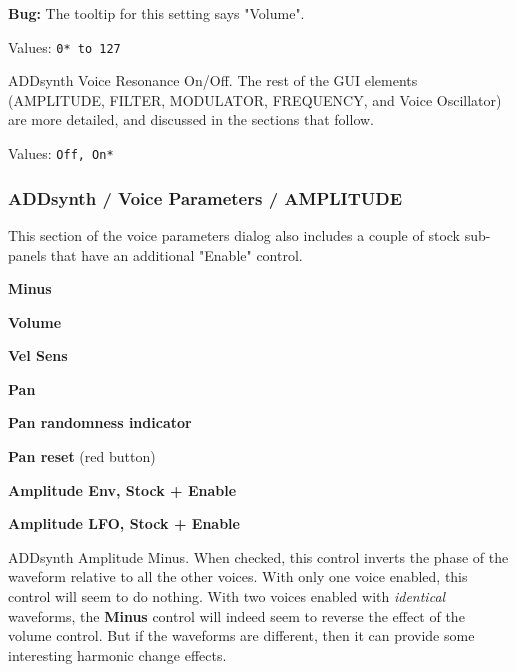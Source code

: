    \textbf{Bug:}
   The tooltip for this setting says "Volume".

   Values: \texttt{0* to 127}

   ADDsynth Voice Resonance On/Off.
   The rest of the GUI elements
   (AMPLITUDE, FILTER, MODULATOR, FREQUENCY, and Voice Oscillator)
   are more detailed, and discussed in the sections that follow.

   Values: \texttt{Off, On*}

\subsubsection{ADDsynth / Voice Parameters / AMPLITUDE}
\label{subsubsec:addsynth_voice_parameters_amplitude}

   This section of the voice parameters dialog also includes a couple of
   stock sub-panels that have an additional "Enable" control.

   \begin{enumber}
      \item \textbf{Minus}
      \item \textbf{Volume}
      \item \textbf{Vel Sens}
      \item \textbf{Pan}
      \item \textbf{Pan randomness indicator}
      \item \textbf{Pan reset} (red button)
      \item \textbf{Amplitude Env, Stock + Enable}
      \item \textbf{Amplitude LFO, Stock + Enable}
   \end{enumber}

   \setcounter{ItemCounter}{0}      %

   ADDsynth Amplitude Minus.
   When checked, this control inverts the phase of the waveform relative to all
   the other voices.
   With only one voice enabled, this control will seem to do nothing.
   With two voices enabled with \textsl{identical} waveforms, the
   \textbf{Minus} control will indeed seem to reverse the effect of the volume
   control. But if the waveforms are different, then it can provide some
   interesting harmonic change effects.

